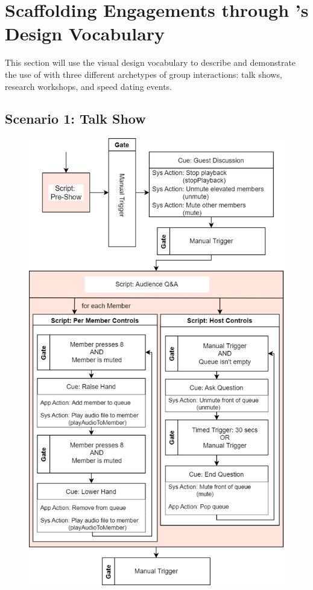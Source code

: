 \section{Scaffolding Engagements through \ONT{}'s Design Vocabulary}
\label{section:scenarios}

This section will use the visual design vocabulary to describe and demonstrate the use of \ONT{} with three different archetypes of group interactions: talk shows, research workshops, and speed dating events. 

\subsection{Scenario 1: Talk Show}

\begin{figure}[h]
  \centering
  \includegraphics[width=0.5\columnwidth]{images/example_talkshow.drawio.png}

\end{figure}

